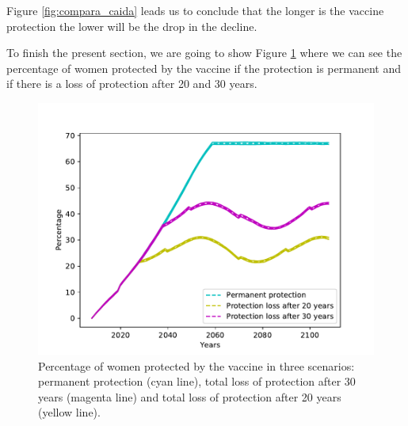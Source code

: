 Figure \ref{fig:compara_caida} leads us to conclude that the longer is the vaccine protection the lower will be the drop in the decline. 

To finish the present section, we are going to show Figure \ref{fig:proteccion} where we can see the percentage of women protected by the vaccine if the protection is permanent and if there is a loss of protection after 20 and 30 years.

\begin{figure}[!]
	\centering
	\includegraphics[width=0.5\linewidth]{IMGs/7.-Compara_caida/proteccion_muj.pdf}	
	\caption{Percentage of women protected by the vaccine in three scenarios: permanent protection (cyan line), total loss of protection after 30 years (magenta line) and total loss of protection after 20 years (yellow line).}
	\label{fig:proteccion}
\end{figure}

